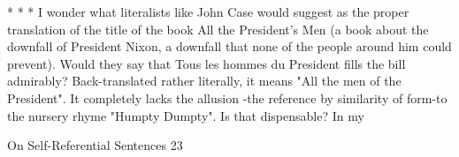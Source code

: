                                      *       *       *
         I wonder what literalists like John Case would suggest as the proper translation of
the title of the book All the President's Men (a book about the downfall of President
Nixon, a downfall that none of the people around him could prevent). Would they say
that Tous les hommes du President fills the bill admirably? Back-translated rather
literally, it means "All the men of the President". It completely lacks the allusion -the
reference by similarity of form-to the nursery rhyme "Humpty Dumpty". Is that
dispensable? In my




On Self-Referential Sentences                                                             23
